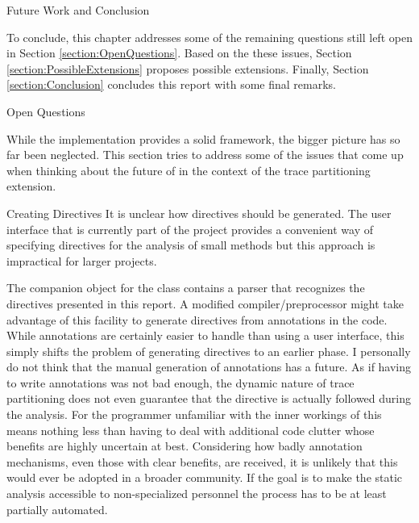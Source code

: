 %

\begin{chapter}{Future Work and Conclusion}
	\label{chapter:Discussion}

	To conclude, this chapter addresses some of the remaining questions still left open in Section \ref{section:OpenQuestions}. Based on the these issues, Section \ref{section:PossibleExtensions} proposes possible extensions. Finally, Section \ref{section:Conclusion} concludes this report with some final remarks.


	\begin{section}{Open Questions}
		\label{section:OpenQuestions}

		While the implementation provides a solid framework, the bigger picture has so far been neglected. This section tries to address some of the issues that come up when thinking about the future of \sample in the context of the trace partitioning extension.
		

		\begin{subsection}{Creating Directives}
			It is unclear how directives should be generated. The user interface that is currently part of the \sample project provides a convenient way of specifying directives for the analysis of small methods but this approach is impractical for larger projects.

			The companion object for the  class contains a parser that recognizes the directives presented in this report. A modified compiler/preprocessor might take advantage of this facility to generate directives from annotations in the code. While annotations are certainly easier to handle than using a user interface, this simply shifts the problem of generating directives to an earlier phase. I personally do not think that the manual generation of annotations has a future. As if having to write annotations was not bad enough, the dynamic nature of trace partitioning does not even guarantee that the directive is actually followed during the analysis. For the programmer unfamiliar with the inner workings of \sample this means nothing less than having to deal with additional code clutter whose benefits are highly uncertain at best. Considering how badly annotation mechanisms, even those with clear benefits, are received, it is unlikely that this would ever be adopted in a broader community. If the goal is to make the static analysis accessible to non-specialized personnel the process has to be at least partially automated. 


\end{subsection}
\end{section}
\end{chapter}
